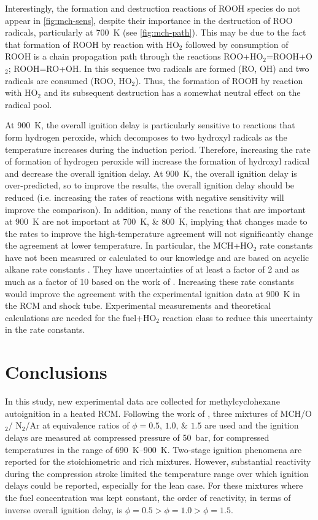 \documentclass[../main.tex]{subfiles}
\begin{document}
Interestingly, the formation and destruction reactions of ROOH species
do not appear in \cref{fig:mch-sens}, despite their importance in
the destruction of ROO radicals, particularly at \SI{700}{\kelvin}
(see \cref{fig:mch-path}). This may be due to the fact that
formation of ROOH by reaction with HO$_2$ followed by consumption of ROOH
is a chain propagation path through the reactions ROO+HO$_2$=ROOH+O$_2$;
ROOH=RO+OH. In this sequence two radicals are formed (RO, OH) and two
radicals are consumed (ROO, HO$_2$). Thus, the formation of ROOH by
reaction with HO$_2$ and its subsequent destruction has a somewhat
neutral effect on the radical pool.

At \SI{900}{\kelvin}, the overall ignition delay is particularly sensitive
to reactions that form hydrogen peroxide, which decomposes to two
hydroxyl radicals as the temperature increases during the induction
period. Therefore, increasing the rate of formation of hydrogen peroxide
will increase the formation of hydroxyl radical and decrease the overall
ignition delay. At \SI{900}{\kelvin}, the overall ignition delay is
over-predicted, so to improve the results, the overall ignition delay
should be reduced (i.e. increasing the rates of reactions with negative
sensitivity will improve the comparison). In addition, many of the
reactions that are important at \SI{900}{\kelvin} are not important at
\SIlist{700;800}{\kelvin}, implying that changes made to the rates to
improve the high-temperature agreement will not significantly change the
agreement at lower temperature. In particular, the MCH+HO$_2$ rate constants
have not been measured or calculated to our knowledge and are based
on acyclic alkane rate constants \cite{Aguilera-Iparraguirre2008}. They have uncertainties of at
least a factor of 2 and as much as a factor of 10 based on the work
of \textcite{Aguilera-Iparraguirre2008}. Increasing these rate constants
would improve the agreement with the experimental ignition data at
\SI{900}{\kelvin} in the RCM and shock tube. Experimental measurements
and theoretical calculations are needed for the fuel+HO$_2$ reaction class to
reduce this uncertainty in the rate constants.

\section{Conclusions}

In this study, new experimental data are collected for methylcyclohexane
autoignition in a heated RCM. Following the work
of \textcite{Mittal2009}, three mixtures of MCH/O$_2$/ N$_2$/Ar at equivalence
ratios of $\phi=\numlist{0.5;1.0;1.5}$ are used and the ignition delays
are measured at compressed pressure of \SI{50}{\bar}, for compressed
temperatures in the range of \SIrange{690}{900}{\kelvin}. Two-stage
ignition phenomena are reported for the stoichiometric and rich
mixtures. However, substantial reactivity during the compression
stroke limited the temperature range over which ignition delays could
be reported, especially for the lean case. For these mixtures where the
fuel concentration was kept constant, the order of reactivity, in terms
of inverse overall ignition delay, is $\phi=\num{0.5}>\phi=\num{1.0}>\phi=\num{1.5}$.
\end{document}
